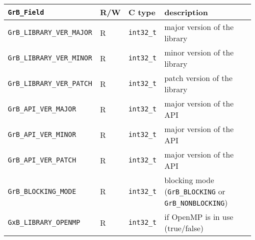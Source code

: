 \noindent
{\small
\begin{tabular}{|l|l|l|p{2.5in}|}
\hline
\verb'GrB_Field'                    & R/W  & C type        & description \\
\hline
\verb'GrB_LIBRARY_VER_MAJOR'        & R    & \verb'int32_t'& major version of the library \\
\verb'GrB_LIBRARY_VER_MINOR'        & R    & \verb'int32_t'& minor version of the library \\
\verb'GrB_LIBRARY_VER_PATCH'        & R    & \verb'int32_t'& patch version of the library \\
\verb'GrB_API_VER_MAJOR'            & R    & \verb'int32_t'& major version of the API \\
\verb'GrB_API_VER_MINOR'            & R    & \verb'int32_t'& major version of the API \\
\verb'GrB_API_VER_PATCH'            & R    & \verb'int32_t'& major version of the API \\
\verb'GrB_BLOCKING_MODE'            & R    & \verb'int32_t'& blocking mode (\verb'GrB_BLOCKING' \newline
                                                                or \verb'GrB_NONBLOCKING') \\
\verb'GxB_LIBRARY_OPENMP'           & R    & \verb'int32_t'& if OpenMP is in use (true/false) \\
\hline
\end{tabular}
}
\vspace{0.05in}

